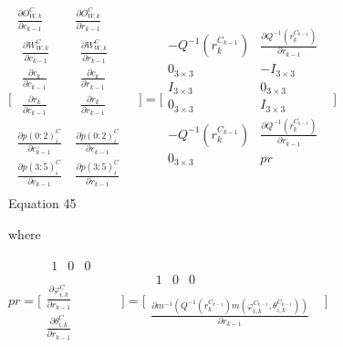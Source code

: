 $\lbrack \begin{matrix}
\frac{\partial O_{W,k}^{C}}{\partial c_{k-1}} & \frac{\partial 
O_{W,k}^{C}}{\partial r_{k-1}} & \\
\begin{matrix}
\frac{\partial W_{W,k}^{C}}{\partial c_{k-1}} & \\
\frac{\partial c_{k}}{\partial c_{k-1}} & \\
\frac{\partial r_{k}}{\partial c_{k-1}} & \\
\end{matrix}
 & \begin{matrix}
\frac{\partial W_{W,k}^{C}}{\partial r_{k-1}} & \\
\frac{\partial c_{k}}{\partial r_{k-1}} & \\
\frac{\partial r_{k}}{\partial r_{k-1}} & \\
\end{matrix}
 & \\
\frac{\partial p(0:2)_{i}^{C}}{\partial c_{k-1}} & \frac{\partial 
p(0:2)_{i}^{C}}{\partial r_{k-1}} & \\
\frac{\partial p(3:5)_{i}^{C}}{\partial c_{k-1}} & \frac{\partial 
p(3:5)_{i}^{C}}{\partial r_{k-1}} & \\
\end{matrix}
\rbrack =\lbrack \begin{matrix}
-Q^{-1}(r_{k}^{C_{k-1}}) & \frac{\partial 
Q^{-1}(r_{k}^{C_{k-1}})}{\partial r_{k-1}} & \\
0_{3\times 3} & -I_{3\times 3} & \\
I_{3\times 3} & 0_{3\times 3} & \\
0_{3\times 3} & I_{3\times 3} & \\
-Q^{-1}(r_{k}^{C_{k-1}}) & \frac{\partial 
Q^{-1}(r_{k}^{C_{k-1}})}{\partial r_{k-1}} & \\
0_{3\times 3} & pr & \\
\end{matrix}
\rbrack $\\


Equation 45

where

$pr=\lbrack \begin{matrix}
\begin{matrix}
1 & 0 & 0 & \\
\end{matrix}
 & \\
\frac{\partial \varphi _{i, k}^{C}}{\partial r_{k-1}} & \\
\frac{\partial \theta _{i, k}^{C}}{\partial r_{k-1}} & \\
\end{matrix}
\rbrack =\lbrack \begin{matrix}
\begin{matrix}
1 & 0 & 0 & \\
\end{matrix}
 & \\
\frac{\partial m^{-1}(Q^{-1}(r_{k}^{C_{k-1}})m(\varphi _{i, 
k}^{C_{k-1}}, \theta _{i, k}^{C_{k-1}}))}{\partial r_{k-1}} & \\
\end{matrix}
\rbrack $\\


